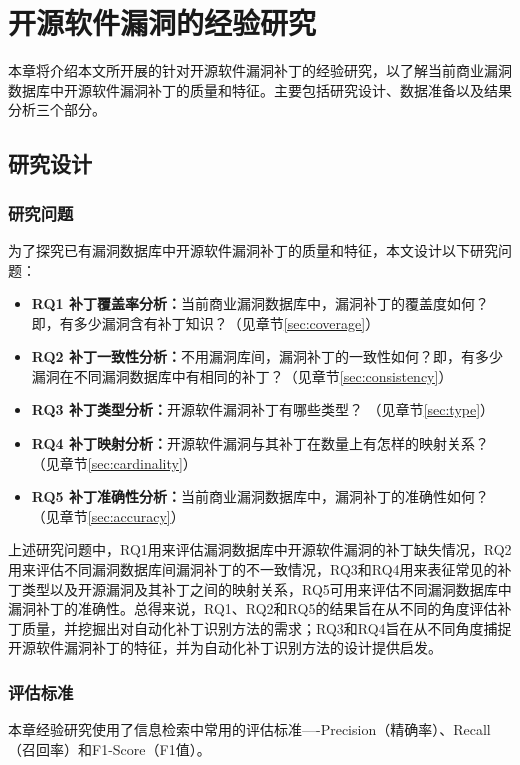 \chapter{开源软件漏洞的经验研究}\label{sec:study}

本章将介绍本文所开展的针对开源软件漏洞补丁的经验研究，以了解当前商业漏洞数据库中开源软件漏洞补丁的质量和特征。主要包括研究设计、数据准备以及结果分析三个部分。


\section{研究设计}
\subsection{研究问题}
为了探究已有漏洞数据库中开源软件漏洞补丁的质量和特征，本文设计以下研究问题：

\begin{itemize}[leftmargin=*]
    \item \textbf{RQ1 补丁覆盖率分析：}当前商业漏洞数据库中，漏洞补丁的覆盖度如何？即，有多少漏洞含有补丁知识？（见章节\ref{sec:coverage}）
    \item \textbf{RQ2 补丁一致性分析：}不用漏洞库间，漏洞补丁的一致性如何？即，有多少漏洞在不同漏洞数据库中有相同的补丁？（见章节\ref{sec:consistency}）
    \item \textbf{RQ3 补丁类型分析：}开源软件漏洞补丁有哪些类型？ （见章节\ref{sec:type}）
    \item \textbf{RQ4 补丁映射分析：}开源软件漏洞与其补丁在数量上有怎样的映射关系？ （见章节\ref{sec:cardinality}）
    \item \textbf{RQ5 补丁准确性分析：}当前商业漏洞数据库中，漏洞补丁的准确性如何？ （见章节\ref{sec:accuracy}）
\end{itemize}
    
上述研究问题中，RQ1用来评估漏洞数据库中开源软件漏洞的补丁缺失情况，RQ2用来评估不同漏洞数据库间漏洞补丁的不一致情况，RQ3和RQ4用来表征常见的补丁类型以及开源漏洞及其补丁之间的映射关系，RQ5可用来评估不同漏洞数据库中漏洞补丁的准确性。总得来说，RQ1、RQ2和RQ5的结果旨在从不同的角度评估补丁质量，并挖掘出对自动化补丁识别方法的需求；RQ3和RQ4旨在从不同角度捕捉开源软件漏洞补丁的特征，并为自动化补丁识别方法的设计提供启发。

\subsection{评估标准}\label{sec:metric}
本章经验研究使用了信息检索中常用的评估标准----Precision（精确率）、Recall（召回率）和F1-Score（F1值）。

